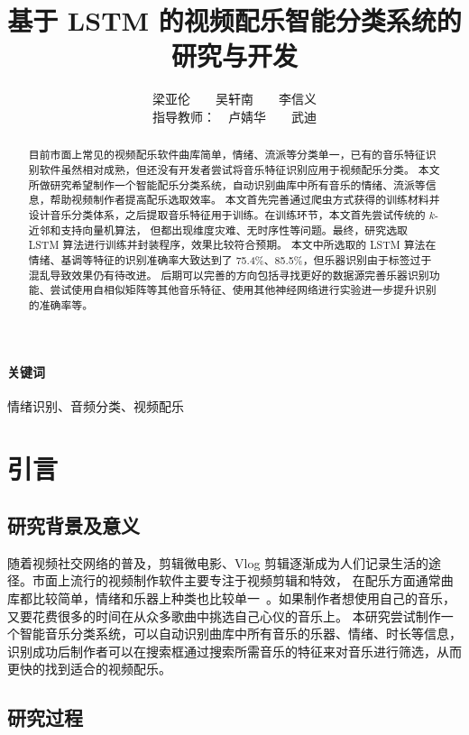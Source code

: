 \documentclass[a4paper,utf8,10pt]{article}
\title{基于 LSTM 的视频配乐智能分类系统的研究与开发}
\author{梁亚伦　　吴轩南　　李信义 \\ 指导教师：　卢婧华　　武迪}
\affil{中国人民大学附属中学　　北京　　100080}
\date{}
\begin{document}
\maketitle

\begin{abstract}
目前市面上常见的视频配乐软件曲库简单，情绪、流派等分类单一，已有的音乐特征识别软件虽然相对成熟，但还没有开发者尝试将音乐特征识别应用于视频配乐分类。
本文所做研究希望制作一个智能配乐分类系统，自动识别曲库中所有音乐的情绪、流派等信息，帮助视频制作者提高配乐选取效率。
本文首先完善通过爬虫方式获得的训练材料并设计音乐分类体系，之后提取音乐特征用于训练。在训练环节，本文首先尝试传统的 $k$-近邻和支持向量机算法，
但都出现维度灾难、无时序性等问题。最终，研究选取 LSTM 算法进行训练并封装程序，效果比较符合预期。
本文中所选取的 LSTM 算法在情绪、基调等特征的识别准确率大致达到了 75.4\%、85.5\%，但乐器识别由于标签过于混乱导致效果仍有待改进。
后期可以完善的方向包括寻找更好的数据源完善乐器识别功能、尝试使用自相似矩阵等其他音乐特征、使用其他神经网络进行实验进一步提升识别的准确率等。
\end{abstract}

\paragraph{关键词} 情绪识别、音频分类、视频配乐

\section{引言}

\subsection{研究背景及意义}

随着视频社交网络的普及，剪辑微电影、Vlog 剪辑逐渐成为人们记录生活的途径。市面上流行的视频制作软件主要专注于视频剪辑和特效，
在配乐方面通常曲库都比较简单，情绪和乐器上种类也比较单一~\cite{boixx14}。如果制作者想使用自己的音乐，又要花费很多的时间在从众多歌曲中挑选自己心仪的音乐上。
本研究尝试制作一个智能音乐分类系统，可以自动识别曲库中所有音乐的乐器、情绪、时长等信息，
识别成功后制作者可以在搜索框通过搜索所需音乐的特征来对音乐进行筛选，从而更快的找到适合的视频配乐。

\subsection{研究过程}
\end{document}

